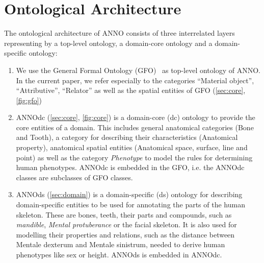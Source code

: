 \documentclass[sw]{iosart2x}
\begin{document}

\section{Ontological Architecture}\label{sec:architecture}

The ontological architecture of ANNO consists of three interrelated layers representing by a top-level ontology, a domain-core ontology and a domain-specific ontology:

\begin{enumerate}
\item We use the General Formal Ontology (GFO)~\citep{gfo} as top-level ontology of ANNO.
In the current paper, we refer especially to the categories \enquote{Material object}, \enquote{Attributive}, \enquote{Relator} as well as the spatial entities of GFO (\cref{sec:core}, \cref{fig:gfo})

\item ANNOdc (\cref{sec:core}, \cref{fig:core}) is a domain-core (dc) ontology to provide the core entities of a domain.
This includes general anatomical categories (Bone and Tooth), a category for describing their characteristics (Anatomical property), anatomical spatial entities (Anatomical space, surface, line and point) as well as the category \emph{Phenotype} to model the rules for determining human phenotypes.
ANNOdc is embedded in the GFO, i.e. the ANNOdc classes are subclasses of GFO classes.

\item ANNOds (\cref{sec:domain}) is a domain-specific (ds) ontology for describing domain-specific entities to be used for annotating the parts of the human skeleton.
These are bones, teeth, their parts and compounds, such as \emph{mandible}, \emph{Mental protuberance} or the facial skeleton.
It is also used for modelling their properties and relations, such as the distance between Mentale dexterum and Mentale sinistrum, needed to derive human phenotypes like sex or height.
ANNOds is embedded in ANNOdc.
\end{enumerate}

\end{document}
